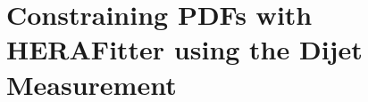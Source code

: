 %



\section{Constraining PDFs with HERAFitter using the Dijet Measurement}
\label{section:cmsjets2011_pdfconstraints}

%

